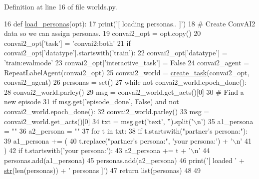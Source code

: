 Definition at line 16 of file worlds.\+py.


\begin{DoxyCode}
16 \textcolor{keyword}{def }\hyperlink{namespaceparlai_1_1tasks_1_1convai2_1_1worlds_a61a758b7cb43183397d002f7f203f586}{load\_personas}(opt):
17     print(\textcolor{stringliteral}{'[ loading personas.. ]'})
18     \textcolor{comment}{# Create ConvAI2 data so we can assign personas.}
19     convai2\_opt = opt.copy()
20     convai2\_opt[\textcolor{stringliteral}{'task'}] = \textcolor{stringliteral}{'convai2:both'}
21     \textcolor{keywordflow}{if} convai2\_opt[\textcolor{stringliteral}{'datatype'}].startswith(\textcolor{stringliteral}{'train'}):
22         convai2\_opt[\textcolor{stringliteral}{'datatype'}] = \textcolor{stringliteral}{'train:evalmode'}
23     convai2\_opt[\textcolor{stringliteral}{'interactive\_task'}] = \textcolor{keyword}{False}
24     convai2\_agent = RepeatLabelAgent(convai2\_opt)
25     convai2\_world = \hyperlink{namespaceparlai_1_1core_1_1worlds_a11923c10b545c7ecc1b08fe2242d9c2c}{create\_task}(convai2\_opt, convai2\_agent)
26     personas = set()
27     \textcolor{keywordflow}{while} \textcolor{keywordflow}{not} convai2\_world.epoch\_done():
28         convai2\_world.parley()
29         msg = convai2\_world.get\_acts()[0]
30         \textcolor{comment}{# Find a new episode}
31         \textcolor{keywordflow}{if} msg.get(\textcolor{stringliteral}{'episode\_done'}, \textcolor{keyword}{False}) \textcolor{keywordflow}{and} \textcolor{keywordflow}{not} convai2\_world.epoch\_done():
32             convai2\_world.parley()
33             msg = convai2\_world.get\_acts()[0]
34             txt = msg.get(\textcolor{stringliteral}{'text'}, \textcolor{stringliteral}{''}).split(\textcolor{stringliteral}{'\(\backslash\)n'})
35             a1\_persona = \textcolor{stringliteral}{""}
36             a2\_persona = \textcolor{stringliteral}{""}
37             \textcolor{keywordflow}{for} t \textcolor{keywordflow}{in} txt:
38                 \textcolor{keywordflow}{if} t.startswith(\textcolor{stringliteral}{"partner's persona:"}):
39                     a1\_persona += (
40                         t.replace(\textcolor{stringliteral}{"partner's persona:"}, \textcolor{stringliteral}{'your persona:'}) + \textcolor{stringliteral}{'\(\backslash\)n'}
41                     )
42                 \textcolor{keywordflow}{if} t.startswith(\textcolor{stringliteral}{'your persona:'}):
43                     a2\_persona += t + \textcolor{stringliteral}{'\(\backslash\)n'}
44             personas.add(a1\_persona)
45             personas.add(a2\_persona)
46     print(\textcolor{stringliteral}{'[ loaded '} + \hyperlink{namespacegenerate__task__READMEs_a5b88452ffb87b78c8c85ececebafc09f}{str}(len(personas)) + \textcolor{stringliteral}{' personas ]'})
47     \textcolor{keywordflow}{return} list(personas)
48 
49 
\end{DoxyCode}
